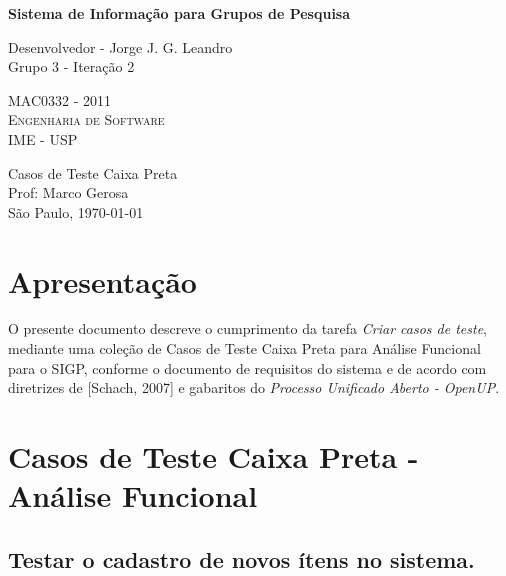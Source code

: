 \documentclass[11pt, a4paper]{book}
\begin{document}
\thispagestyle{empty}
\begin{center}
    \vspace*{0.2cm}
    \textbf{\Large{Sistema de Informação para Grupos de Pesquisa}}\\
	
    \vspace*{1.2cm}

    \Large{Desenvolvedor - Jorge J. G. Leandro}\\
    \Large{Grupo 3 - Iteração 2}
    
    \vskip 2cm
	\textsc{
	MAC0332 - 2011\\[-0.25cm] 
          	Engenharia de Software\\[-0.25cm] 	
	IME - USP\\[-0.25cm]
	}
    
    \vskip 1.5cm
    Casos de Teste Caixa Preta\\
    Prof: Marco Gerosa\\

	
    \vskip 0.5cm
   {\normalsize São Paulo, \today}
\end{center}


\chapter[Apresentação]{Apresentação}
\label{cap:apresentacao}	
	
	 	O presente documento descreve o cumprimento da tarefa \emph{Criar casos de teste}, mediante uma coleção de Casos de Teste Caixa Preta para Análise Funcional para o SIGP, conforme o documento de requisitos do sistema e de acordo com diretrizes de [Schach, 2007] e gabaritos do \emph{Processo Unificado Aberto - OpenUP}.

\chapter[Casos de Teste]{Casos de Teste Caixa Preta - Análise Funcional}
\label{cap:casosdeteste}

\section{Testar o cadastro de novos ítens no sistema.}
\end{document}
